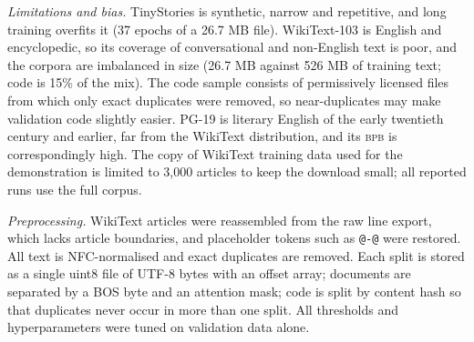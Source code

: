 \documentclass[10pt,twocolumn]{extarticle}
\newcommand{\bpb}{\textsc{bpb}}
\begin{document}
\textit{Limitations and bias.} TinyStories is synthetic, narrow and repetitive, and long training overfits it (37 epochs of a 26.7 MB file). WikiText-103 is English and encyclopedic, so its coverage of conversational and non-English text is poor, and the corpora are imbalanced in size (26.7 MB against 526 MB of training text; code is 15\% of the mix). The code sample consists of permissively licensed files from which only exact duplicates were removed, so near-duplicates may make validation code slightly easier. PG-19 is literary English of the early twentieth century and earlier, far from the WikiText distribution, and its \bpb{} is correspondingly high. The copy of WikiText training data used for the demonstration is limited to 3,000 articles to keep the download small; all reported runs use the full corpus.

\textit{Preprocessing.} WikiText articles were reassembled from the raw line export, which lacks article boundaries, and placeholder tokens such as \texttt{@-@} were restored. All text is NFC-normalised and exact duplicates are removed. Each split is stored as a single uint8 file of UTF-8 bytes with an offset array; documents are separated by a BOS byte and an attention mask; code is split by content hash so that duplicates never occur in more than one split. All thresholds and hyperparameters were tuned on validation data alone.
\end{document}
